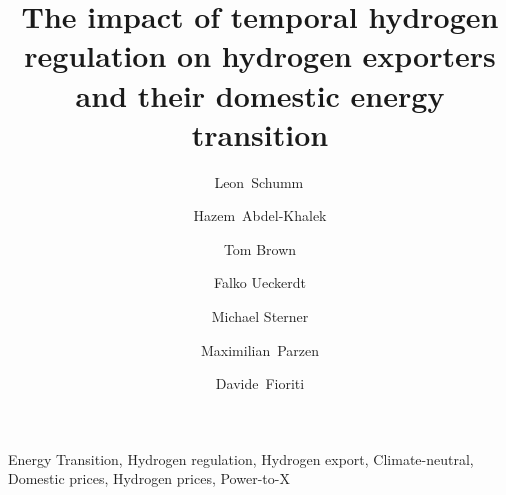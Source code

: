 \documentclass[5p,numafflabel]{elsarticle}
\begin{document}
\begin{frontmatter}

	\title{The impact of temporal hydrogen regulation on hydrogen exporters and their domestic energy transition}

    
	\author[oth,tub,lead]{Leon~Schumm\,}
	\author[ieg,alu]{Hazem~Abdel-Khalek}
	\author[tub]{Tom Brown}
	\author[pik]{Falko Ueckerdt}
	\author[oth]{Michael Sterner}
	\author[uoe]{Maximilian~Parzen}
	\author[unipi]{Davide~Fioriti}


	\address[oth]{Research Center on Energy Transmission and Storage (FENES), Faculty of Electrical and Information Technology, University of Applied Sciences (OTH) Regensburg, Seybothstr. 2, 93053 Regensburg, Germany}
	\address[tub]{Department of Digital Transformation in Energy Systems, Institute of Energy Technology, Technische Universität Berlin, Fakultät III, Einsteinufer 25 (TA 8), 10587 Berlin, Germany}
	\address[ieg]{Fraunhofer Research Institution for Energy Infrastructures and Geothermal Systems IEG, Gulbener Straße 23, 03046 Cottbus, Germany}
	\address[alu]{Albert-Ludwigs Universität Freiburg, Faculty of Environment and Natural Resources, Tennenbacher Str. 4, 79106 Freiburg im Breisgau, Germany}
	\address[pik]{Potsdam Institute for Climate Impact Research, Telegrafenberg, 14473 Potsdam, Germany}
	\address[uoe]{University of Edinburgh, Institute for Energy Systems, EH9 3DW Edinburgh, United Kingdom}
	\address[unipi]{University of Pisa, Department of Energy Systems, Territory and Construction Engineering, Largo Lucio Lazzarino, 56122 Pisa, Italy}
	\address[lead]{Lead contact}

	\begin{abstract}
		
	\end{abstract}

	\begin{keyword}
		Energy Transition, Hydrogen regulation, Hydrogen export, Climate-neutral, Domestic prices, Hydrogen prices, Power-to-X
	\end{keyword}




\end{frontmatter}
\end{document}
